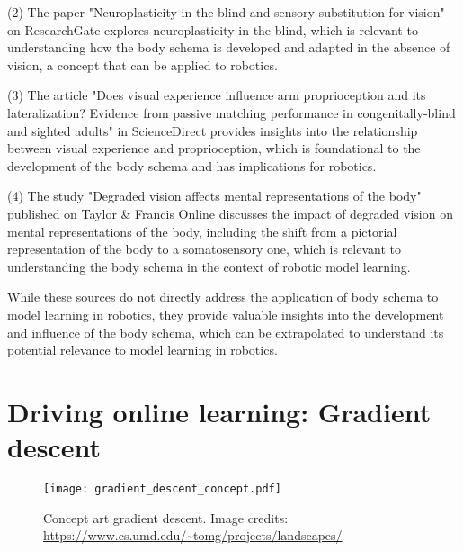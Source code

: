 (2) The paper "Neuroplasticity in the blind and sensory substitution for vision" on ResearchGate explores neuroplasticity in the blind, which is relevant to understanding how the body schema is developed and adapted in the absence of vision, a concept that can be applied to robotics.

(3) The article "Does visual experience influence arm proprioception and its lateralization? Evidence from passive matching performance in congenitally-blind and sighted adults" in ScienceDirect provides insights into the relationship between visual experience and proprioception, which is foundational to the development of the body schema and has implications for robotics.

(4) The study "Degraded vision affects mental representations of the body" published on Taylor \& Francis Online discusses the impact of degraded vision on mental representations of the body, including the shift from a pictorial representation of the body to a somatosensory one, which is relevant to understanding the body schema in the context of robotic model learning.

While these sources do not directly address the application of body schema to model learning in robotics, they provide valuable insights into the development and influence of the body schema, which can be extrapolated to understand its potential relevance to model learning in robotics.


\section{Driving online learning: Gradient descent}
\begin{figure}[h!]
	\begin{center}
		\texttt{[image: gradient\_descent\_concept.pdf]}
	\end{center}
	\caption{Concept art gradient descent. Image credits: \url{https://www.cs.umd.edu/~tomg/projects/landscapes/}}
\end{figure}
